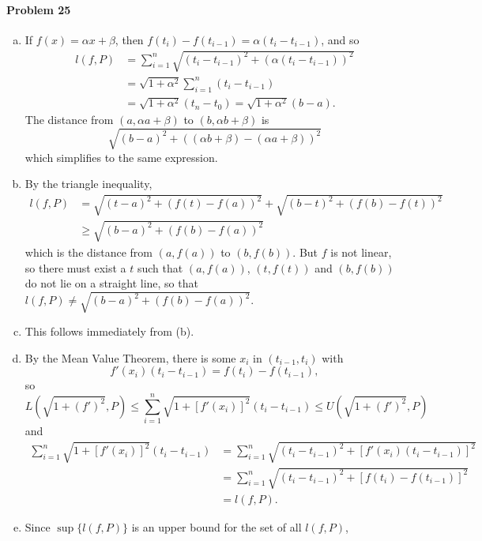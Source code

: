 \documentclass{article}
\begin{document}
\paragraph{Problem 25}
\begin{enumerate}[(a)]
  \item If $f(x) = \alpha x + \beta$, then $f(t_i) - f(t_{i-1}) = \alpha (t_i
    - t_{i-1})$, and so
    \begin{align*}
      l(f, P)
      &= \sum_{i=1}^n \sqrt{(t_i - t_{i-1})^2 + (\alpha(t_i - t_{i-1}))^2} \\
      &= \sqrt{1 + \alpha^2}\sum_{i=1}^n (t_i - t_{i-1}) \\
      &= \sqrt{1 + \alpha^2}(t_n - t_0) = \sqrt{1 + \alpha^2}(b - a).
    \end{align*}
    The distance from $(a, \alpha a + \beta)$ to $(b, \alpha b + \beta)$ is \[
      \sqrt{(b - a)^2 + ((\alpha b + \beta) - (\alpha a + \beta))^2}
    \] which simplifies to the same expression.
  \item By the triangle inequality,
    \begin{align*}
      l(f, P)
      &= \sqrt{(t - a)^2 + (f(t) - f(a))^2} + \sqrt{(b - t)^2 + (f(b) -
      f(t))^2} \\
      &\geq \sqrt{(b - a)^2 + (f(b) - f(a))^2}
    \end{align*}
    which is the distance from $(a, f(a))$ to $(b, f(b))$. But $f$ is not
    linear, so there must exist a $t$ such that $(a, f(a))$, $(t, f(t))$ and
    $(b, f(b))$ do not lie on a straight line, so that $l(f, P) \neq
    \sqrt{(b - a)^2 + (f(b) - f(a))^2}$.
  \item This follows immediately from (b).
  \item  By the Mean Value Theorem, there is some $x_i$ in $(t_{i-1}, t_i)$
    with \[
      f'(x_i)(t_i - t_{i-1}) = f(t_i) - f(t_{i-1}),
    \] so \[
      L(\sqrt{1 + (f')^2}, P)
      \leq \sum_{i=1}^n \sqrt{1 + [f'(x_i)]^2}(t_i - t_{i-1})
      \leq U(\sqrt{1 + (f')^2}, P)
    \] and
    \begin{align*}
      \sum_{i=1}^n \sqrt{1 + [f'(x_i)]^2}(t_i - t_{i-1})
      &= \sum_{i=1}^n \sqrt{(t_i - t_{i-1})^2 + [f'(x_i)(t_i - t_{i-1})]^2} \\
      &= \sum_{i=1}^n \sqrt{(t_i - t_{i-1})^2 + [f(t_i) - f(t_{i-1})]^2} \\
      &= l(f, P).
    \end{align*}
  \item Since $\sup\{l(f, P)\}$ is an upper bound for the set of all $l(f, P)$,

\end{enumerate}
\end{document}
